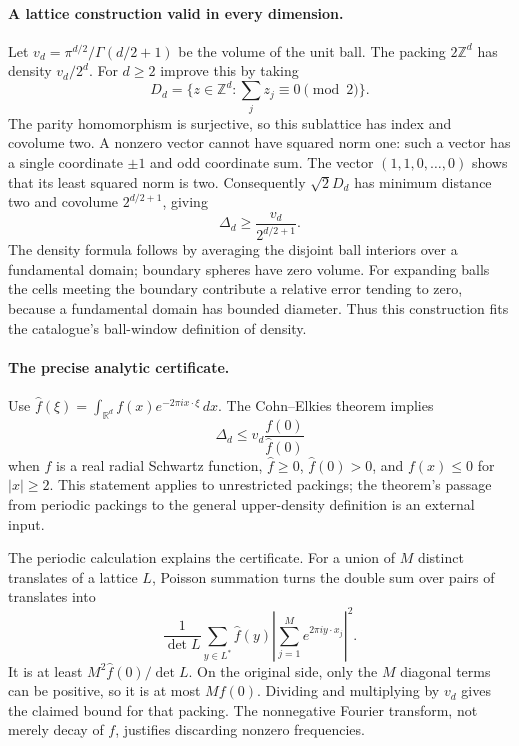 \documentclass[11pt,a4paper]{article}
\begin{document}
\paragraph{A lattice construction valid in every dimension.}
Let $v_d=\pi^{d/2}/\Gamma(d/2+1)$ be the volume of the unit ball. The packing $2\mathbb Z^d$ has density $v_d/2^d$. For $d\ge2$ improve this by taking
\[
D_d=\{z\in\mathbb Z^d:\textstyle\sum_jz_j\equiv0\pmod2\}.
\]
The parity homomorphism is surjective, so this sublattice has index and covolume two. A nonzero vector cannot have squared norm one: such a vector has a single coordinate $\pm1$ and odd coordinate sum. The vector $(1,1,0,\ldots,0)$ shows that its least squared norm is two. Consequently $\sqrt2D_d$ has minimum distance two and covolume $2^{d/2+1}$, giving
\[
\Delta_d\ge \frac{v_d}{2^{d/2+1}}.
\]
The density formula follows by averaging the disjoint ball interiors over a fundamental domain; boundary spheres have zero volume. For expanding balls the cells meeting the boundary contribute a relative error tending to zero, because a fundamental domain has bounded diameter. Thus this construction fits the catalogue's ball-window definition of density.

\paragraph{The precise analytic certificate.}
Use $\widehat f(\xi)=\int_{\mathbb R^d}f(x)e^{-2\pi i x\cdot\xi}\,dx$. The Cohn--Elkies theorem implies
\[
\Delta_d\le v_d\frac{f(0)}{\widehat f(0)}
\]
when $f$ is a real radial Schwartz function, $\widehat f\ge0$, $\widehat f(0)>0$, and $f(x)\le0$ for $|x|\ge2$. This statement applies to unrestricted packings; the theorem's passage from periodic packings to the general upper-density definition is an external input.

The periodic calculation explains the certificate. For a union of $M$ distinct translates of a lattice $L$, Poisson summation turns the double sum over pairs of translates into
\[
\frac1{\det L}\sum_{y\in L^*}\widehat f(y)
 \left|\sum_{j=1}^M e^{2\pi i y\cdot x_j}\right|^2.
\]
It is at least $M^2\widehat f(0)/\det L$. On the original side, only the $M$ diagonal terms can be positive, so it is at most $Mf(0)$. Dividing and multiplying by $v_d$ gives the claimed bound for that packing. The nonnegative Fourier transform, not merely decay of $f$, justifies discarding nonzero frequencies.
\end{document}
